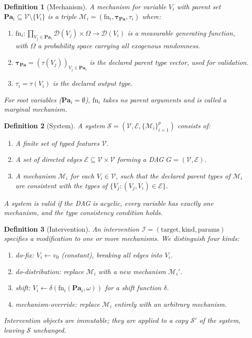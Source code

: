 \documentclass[article]{jss}
\newtheorem{definition}{Definition}
\begin{document}
\begin{definition}[Mechanism]
A \emph{mechanism} for variable $V_i$ with parent set $\mathbf{Pa}_i \subseteq \mathcal{V} \setminus \{V_i\}$ is a triple $\mathcal{M}_i = (\text{fn}_i, \boldsymbol{\tau}_{\mathbf{Pa}}, \tau_i)$ where:
\begin{enumerate}
  \item $\text{fn}_i: \prod_{V_j \in \mathbf{Pa}_i} \mathcal{D}(V_j) \times \Omega \to \mathcal{D}(V_i)$ is a measurable generating function, with $\Omega$ a probability space carrying all exogenous randomness.
  \item $\boldsymbol{\tau}_{\mathbf{Pa}} = (\tau(V_j))_{V_j \in \mathbf{Pa}_i}$ is the declared parent type vector, used for validation.
  \item $\tau_i = \tau(V_i)$ is the declared output type.
\end{enumerate}
For root variables ($\mathbf{Pa}_i = \emptyset$), $\text{fn}_i$ takes no parent arguments and is called a \emph{marginal mechanism}.
\end{definition}

\begin{definition}[System]
A \emph{system} $\mathcal{S} = (\mathcal{V}, \mathcal{E}, \{\mathcal{M}_i\}_{i=1}^p)$ consists of:
\begin{enumerate}
  \item A finite set of typed features $\mathcal{V}$.
  \item A set of directed edges $\mathcal{E} \subseteq \mathcal{V} \times \mathcal{V}$ forming a DAG $G = (\mathcal{V}, \mathcal{E})$.
  \item A mechanism $\mathcal{M}_i$ for each $V_i \in \mathcal{V}$, such that the declared parent types of $\mathcal{M}_i$ are consistent with the types of $\{V_j : (V_j, V_i) \in \mathcal{E}\}$.
\end{enumerate}
A system is \emph{valid} if the DAG is acyclic, every variable has exactly one mechanism, and the type consistency condition holds.
\end{definition}

\begin{definition}[Intervention]
An \emph{intervention} $\mathcal{I} = (\text{target}, \text{kind}, \text{params})$ specifies a modification to one or more mechanisms. We distinguish four kinds:
\begin{enumerate}
  \item \emph{do-fix}: $V_i \leftarrow v_0$ (constant), breaking all edges into $V_i$.
  \item \emph{do-distribution}: replace $\mathcal{M}_i$ with a new mechanism $\mathcal{M}_i'$.
  \item \emph{shift}: $V_i \leftarrow \delta(\text{fn}_i(\mathbf{Pa}_i, \omega))$ for a shift function $\delta$.
  \item \emph{mechanism-override}: replace $\mathcal{M}_i$ entirely with an arbitrary mechanism.
\end{enumerate}
Intervention objects are immutable; they are applied to a copy $\mathcal{S}'$ of the system, leaving $\mathcal{S}$ unchanged.
\end{definition}
\end{document}
